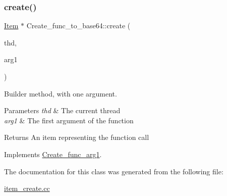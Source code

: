 \subsubsection{\texorpdfstring{create()}{create()}}
{\footnotesize\ttfamily \mbox{\hyperlink{classItem}{Item}} $\ast$ Create\+\_\+func\+\_\+to\+\_\+base64\+::create (\begin{DoxyParamCaption}\item[{T\+HD $\ast$}]{thd,  }\item[{\mbox{\hyperlink{classItem}{Item}} $\ast$}]{arg1 }\end{DoxyParamCaption})\hspace{0.3cm}{\ttfamily [virtual]}}

Builder method, with one argument. 
\begin{DoxyParams}{Parameters}
{\em thd} & The current thread \\
\hline
{\em arg1} & The first argument of the function \\
\hline
\end{DoxyParams}
\begin{DoxyReturn}{Returns}
An item representing the function call 
\end{DoxyReturn}


Implements \mbox{\hyperlink{classCreate__func__arg1_a3e9a98f755cd82c3e762e334c955a8c9}{Create\+\_\+func\+\_\+arg1}}.



The documentation for this class was generated from the following file\+:\begin{DoxyCompactItemize}
\item 
\mbox{\hyperlink{item__create_8cc}{item\+\_\+create.\+cc}}\end{DoxyCompactItemize}
